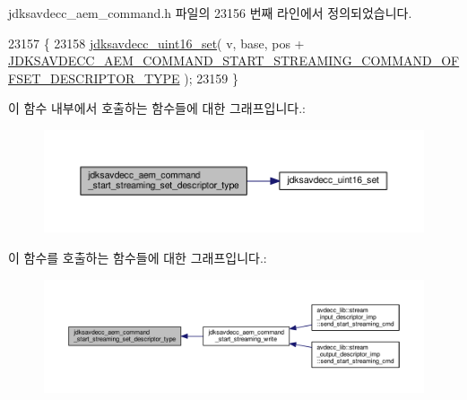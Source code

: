 jdksavdecc\+\_\+aem\+\_\+command.\+h 파일의 23156 번째 라인에서 정의되었습니다.


\begin{DoxyCode}
23157 \{
23158     \hyperlink{group__endian_ga14b9eeadc05f94334096c127c955a60b}{jdksavdecc\_uint16\_set}( v, base, pos + 
      \hyperlink{group__command__start__streaming_gabb27b4fffc256a2d75e42b5084ba543d}{JDKSAVDECC\_AEM\_COMMAND\_START\_STREAMING\_COMMAND\_OFFSET\_DESCRIPTOR\_TYPE}
       );
23159 \}
\end{DoxyCode}


이 함수 내부에서 호출하는 함수들에 대한 그래프입니다.\+:
\nopagebreak
\begin{figure}[H]
\begin{center}
\leavevmode
\includegraphics[width=350pt]{group__command__start__streaming_ga32fc98197f06e9d4d4ca7646afcbfc05_cgraph}
\end{center}
\end{figure}




이 함수를 호출하는 함수들에 대한 그래프입니다.\+:
\nopagebreak
\begin{figure}[H]
\begin{center}
\leavevmode
\includegraphics[width=350pt]{group__command__start__streaming_ga32fc98197f06e9d4d4ca7646afcbfc05_icgraph}
\end{center}
\end{figure}


